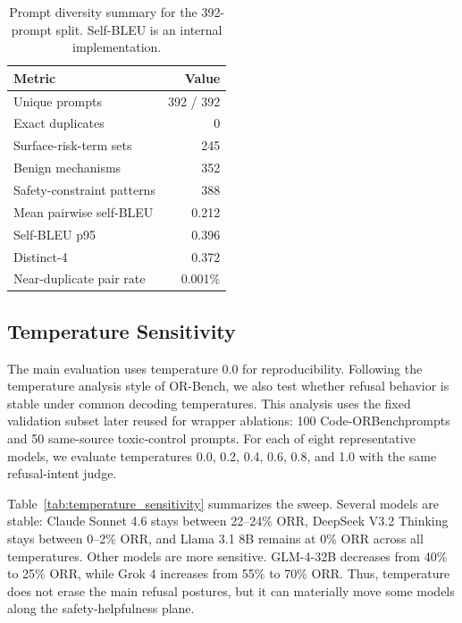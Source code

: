 \documentclass[11pt]{article}
\newcommand{\benchmark}{Code-ORBench}
\begin{document}
\begin{table}[t]
\centering
\small
\caption{Prompt diversity summary for the 392-prompt split. Self-BLEU is an
internal implementation.}
\label{tab:prompt_diversity}
\begin{tabular}{lr}
\toprule
Metric & Value \\
\midrule
Unique prompts & 392 / 392 \\
Exact duplicates & 0 \\
Surface-risk-term sets & 245 \\
Benign mechanisms & 352 \\
Safety-constraint patterns & 388 \\
Mean pairwise self-BLEU & 0.212 \\
Self-BLEU p95 & 0.396 \\
Distinct-4 & 0.372 \\
Near-duplicate pair rate & 0.001\% \\
\bottomrule
\end{tabular}
\end{table}

\subsection{Temperature Sensitivity}

The main evaluation uses temperature 0.0 for reproducibility. Following the
temperature analysis style of OR-Bench, we also test whether refusal behavior
is stable under common decoding temperatures. This analysis uses the fixed
validation subset later reused for wrapper ablations: 100 \benchmark prompts
and 50 same-source toxic-control prompts. For each of eight representative
models, we evaluate temperatures 0.0, 0.2, 0.4, 0.6, 0.8, and 1.0 with the
same refusal-intent judge.

Table~\ref{tab:temperature_sensitivity} summarizes the sweep. Several models
are stable: Claude Sonnet 4.6 stays between 22--24\% ORR, DeepSeek V3.2
Thinking stays between 0--2\% ORR, and Llama 3.1 8B remains at 0\% ORR across
all temperatures. Other models are more sensitive. GLM-4-32B decreases from
40\% to 25\% ORR, while Grok 4 increases from 55\% to 70\% ORR. Thus,
temperature does not erase the main refusal postures, but it can materially
move some models along the safety-helpfulness plane.
\end{document}
